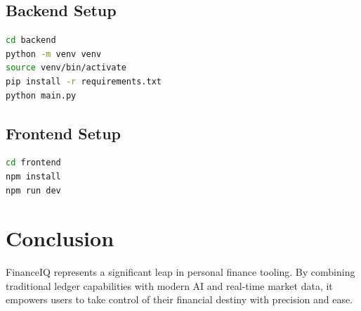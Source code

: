 \documentclass[12pt, a4paper]{report}
\begin{document}
\section{Backend Setup}
\begin{lstlisting}[language=bash]
cd backend
python -m venv venv
source venv/bin/activate
pip install -r requirements.txt
python main.py
\end{lstlisting}

\section{Frontend Setup}
\begin{lstlisting}[language=bash]
cd frontend
npm install
npm run dev
\end{lstlisting}

\chapter{Conclusion}
FinanceIQ represents a significant leap in personal finance tooling. By combining traditional ledger capabilities with modern AI and real-time market data, it empowers users to take control of their financial destiny with precision and ease.
\end{document}
